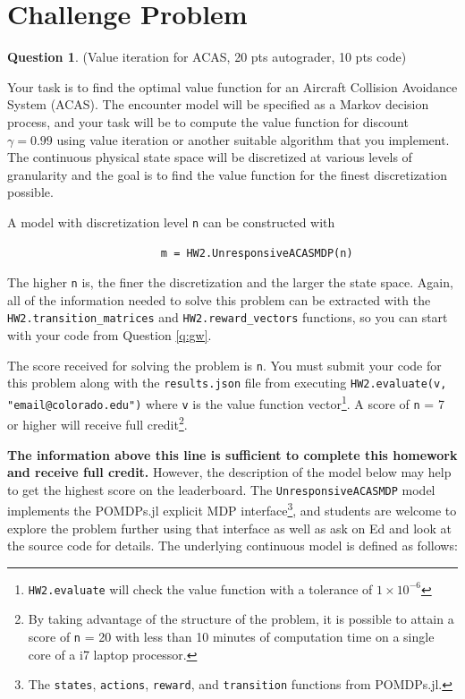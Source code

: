 \documentclass{article}
\theoremstyle{definition}
\newtheorem{question}[thm]{Question}
\begin{document}
\section{Challenge Problem}

\begin{question}
    (Value iteration for ACAS, 20 pts autograder, 10 pts code)

Your task is to find the optimal value function for an Aircraft Collision Avoidance System (ACAS). The encounter model will be specified as a Markov decision process, and your task will be to compute the value function for discount $\gamma=0.99$ using value iteration or another suitable algorithm that you implement. The continuous physical state space will be discretized at various levels of granularity and the goal is to find the value function for the finest discretization possible.

A model with discretization level \texttt{n} can be constructed with
\begin{verbatim}
                        m = HW2.UnresponsiveACASMDP(n)
\end{verbatim}
The higher \texttt{n} is, the finer the discretization and the larger the state space. Again, all of the information needed to solve this problem can be extracted with the \texttt{HW2.transition\_matrices} and \texttt{HW2.reward\_vectors} functions, so you can start with your code from Question \ref{q:gw}.

The score received for solving the problem is \texttt{n}. You must submit your code for this problem along with the \texttt{results.json} file from executing \texttt{HW2.evaluate(v, "email@colorado.edu")} where \texttt{v} is the value function vector\footnote{\texttt{HW2.evaluate} will check the value function with a tolerance of $1 \times 10^{-6}$}. A score of \texttt{n} = 7 or higher will receive full credit\footnote{By taking advantage of the structure of the problem, it is possible to attain a score of \texttt{n} = 20 with less than 10 minutes of computation time on a single core of a i7 laptop processor.}.

\vspace{1em}
\noindent\makebox[\linewidth]{\rule{\textwidth}{0.4pt}}
\vspace{1em}

\textbf{The information above this line is sufficient to complete this homework and receive full credit.} However, the description of the model below may help to get the highest score on the leaderboard. The \texttt{UnresponsiveACASMDP} model implements the POMDPs.jl explicit MDP interface\footnote{The \texttt{states}, \texttt{actions}, \texttt{reward}, and \texttt{transition} functions from POMDPs.jl.}, and students are welcome to explore the problem further using that interface as well as ask on Ed and look at the source code for details. The underlying continuous model is defined as follows:


\end{question}
\end{document}

